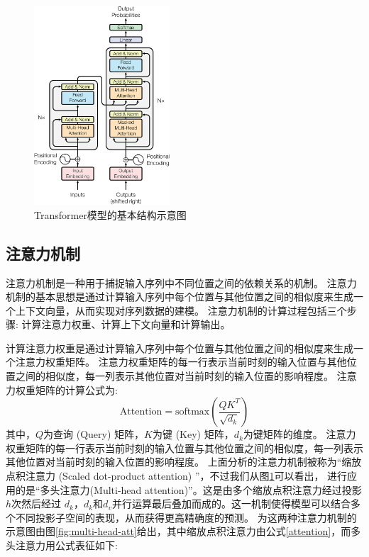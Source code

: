 \begin{figure}[htbp]
  \centering
  \includegraphics[width=0.45\textwidth]{figures/transformer.png}
  \caption{Transformer模型的基本结构示意图\cite{vaswani2017attention}}
  \label{transformer}
\end{figure}

\subsection{注意力机制}
注意力机制是一种用于捕捉输入序列中不同位置之间的依赖关系的机制。
注意力机制的基本思想是通过计算输入序列中每个位置与其他位置之间的相似度来生成一个上下文向量，从而实现对序列数据的建模。
注意力机制的计算过程包括三个步骤: 计算注意力权重、计算上下文向量和计算输出。


计算注意力权重是通过计算输入序列中每个位置与其他位置之间的相似度来生成一个注意力权重矩阵。
注意力权重矩阵的每一行表示当前时刻的输入位置与其他位置之间的相似度，每一列表示其他位置对当前时刻的输入位置的影响程度。
注意力权重矩阵的计算公式为\cite{vaswani2017attention}:
\begin{equation}
  \label{attention}
  \text{Attention} = \text{softmax}\left(\frac{QK^T}{\sqrt{d_k}}\right)
\end{equation}
其中，$Q$为查询 (Query) 矩阵，$K$为键 (Key) 矩阵，$d_k$为键矩阵的维度。
注意力权重矩阵的每一行表示当前时刻的输入位置与其他位置之间的相似度，每一列表示其他位置对当前时刻的输入位置的影响程度。
上面分析的注意力机制被称为“缩放点积注意力 (Scaled dot-product attention) ”，不过我们从图\ref{transformer}可以看出，
进行应用的是“多头注意力(Multi-head attention)”。这是由多个缩放点积注意力经过投影$h$次然后经过
$d_k$，$d_k$和$d_v$并行运算最后叠加而成的。这一机制使得模型可以结合多个不同投影子空间的表现，从而获得更高精确度的预测。
为这两种注意力机制的示意图由图\ref{fig:multi-head-att}给出，其中缩放点积注意力由公式\ref{attention}，而多头注意力用公式表征如下\cite{vaswani2017attention}:

